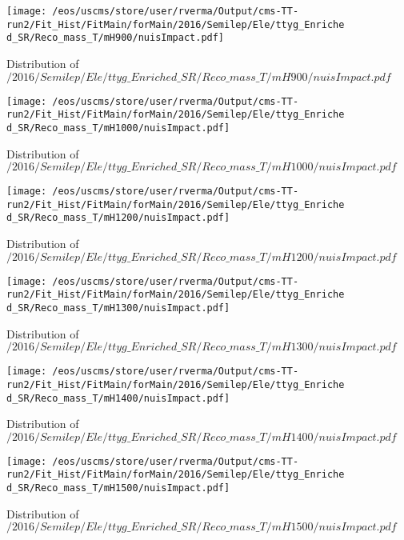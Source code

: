 \begin{figure}
\centering
\texttt{[image: /eos/uscms/store/user/rverma/Output/cms-TT-run2/Fit\_Hist/FitMain/forMain/2016/Semilep/Ele/ttyg\_Enriched\_SR/Reco\_mass\_T/mH900/nuisImpact.pdf]}
\caption{Distribution of $/2016/Semilep/Ele/ttyg\_Enriched\_SR/Reco\_mass\_T/mH900/nuisImpact.pdf$}
\end{figure}

\begin{figure}
\centering
\texttt{[image: /eos/uscms/store/user/rverma/Output/cms-TT-run2/Fit\_Hist/FitMain/forMain/2016/Semilep/Ele/ttyg\_Enriched\_SR/Reco\_mass\_T/mH1000/nuisImpact.pdf]}
\caption{Distribution of $/2016/Semilep/Ele/ttyg\_Enriched\_SR/Reco\_mass\_T/mH1000/nuisImpact.pdf$}
\end{figure}

\begin{figure}
\centering
\texttt{[image: /eos/uscms/store/user/rverma/Output/cms-TT-run2/Fit\_Hist/FitMain/forMain/2016/Semilep/Ele/ttyg\_Enriched\_SR/Reco\_mass\_T/mH1200/nuisImpact.pdf]}
\caption{Distribution of $/2016/Semilep/Ele/ttyg\_Enriched\_SR/Reco\_mass\_T/mH1200/nuisImpact.pdf$}
\end{figure}

\begin{figure}
\centering
\texttt{[image: /eos/uscms/store/user/rverma/Output/cms-TT-run2/Fit\_Hist/FitMain/forMain/2016/Semilep/Ele/ttyg\_Enriched\_SR/Reco\_mass\_T/mH1300/nuisImpact.pdf]}
\caption{Distribution of $/2016/Semilep/Ele/ttyg\_Enriched\_SR/Reco\_mass\_T/mH1300/nuisImpact.pdf$}
\end{figure}

\begin{figure}
\centering
\texttt{[image: /eos/uscms/store/user/rverma/Output/cms-TT-run2/Fit\_Hist/FitMain/forMain/2016/Semilep/Ele/ttyg\_Enriched\_SR/Reco\_mass\_T/mH1400/nuisImpact.pdf]}
\caption{Distribution of $/2016/Semilep/Ele/ttyg\_Enriched\_SR/Reco\_mass\_T/mH1400/nuisImpact.pdf$}
\end{figure}

\begin{figure}
\centering
\texttt{[image: /eos/uscms/store/user/rverma/Output/cms-TT-run2/Fit\_Hist/FitMain/forMain/2016/Semilep/Ele/ttyg\_Enriched\_SR/Reco\_mass\_T/mH1500/nuisImpact.pdf]}
\caption{Distribution of $/2016/Semilep/Ele/ttyg\_Enriched\_SR/Reco\_mass\_T/mH1500/nuisImpact.pdf$}
\end{figure}

